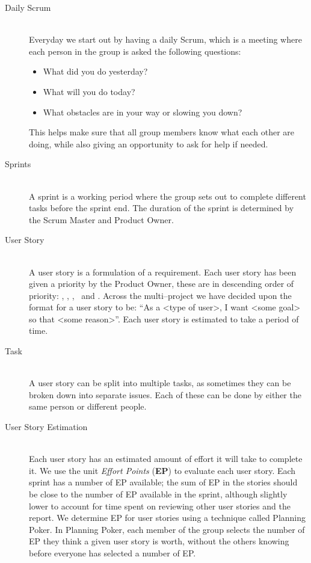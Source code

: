 \begin{description}
	\item[Daily Scrum] \hfill \\
	Everyday we start out by having a daily Scrum, which is a meeting where each person in the group is asked the following questions:
		\begin{itemize}
		    \item What did you do yesterday?
			\item What will you do today?
			\item What obstacles are in your way or slowing you down?
		\end{itemize}
		This helps make sure that all group members know what each other are doing, while also giving an opportunity to ask for help if needed.
	\item[Sprints] \hfill \\
	A sprint is a working period where the group sets out to complete different tasks before the sprint end.
	The duration of the sprint is determined by the Scrum Master and Product Owner.
	\item[User Story] \hfill \\
	A user story is a formulation of a requirement.
	Each user story has been given a priority by the Product Owner, these are in descending order of priority: \pblocking, \phigh, \pnormal, \plow~and \pwish.
	Across the multi--project we have decided upon the format for a user story to be: \enquote{As a <type of user>, I want <some goal> so that <some reason>}.
	Each user story is estimated to take a period of time.
	\item[Task] \hfill \\
	A user story can be split into multiple tasks, as sometimes they can be broken down into separate issues.
	Each of these can be done by either the same person or different people.
	\item[User Story Estimation] \hfill \\
	Each user story has an estimated amount of effort it will take to complete it.
	We use the unit \textit{Effort Points} (\textbf{EP}) to evaluate each user story.
	Each sprint has a number of EP available; the sum of EP in the stories should be close to the number of EP available in the sprint, although slightly lower to account for time spent on reviewing other user stories and the report.
	We determine EP for user stories using a technique called Planning Poker.
	In Planning Poker, each member of the group selects the number of EP they think a given user story is worth, without the others knowing before everyone has selected a number of EP.

\end{description}

